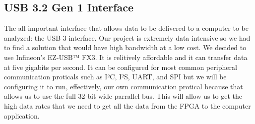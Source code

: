\subsection{USB 3.2 Gen 1 Interface}
	The all-important interface that allows data to be delivered to a computer to be analyzed: the USB 3 interface. Our project is extremely data intensive so we had to find a solution that would have high bandwidth at a low cost. We decided to use Infineon's EZ-USB™ FX3. It is relitively affordable and it can transfer data at five gigabits per second. It can be configured for most common peripheral communication proticals such as I²C, I²S, UART, and SPI but we will be configuring it to run, effectively, our own communication protical because that allows us to use the full 32-bit wide parrallel bus. This will allow us to get the high data rates that we need to get all the data from the FPGA to the computer application.